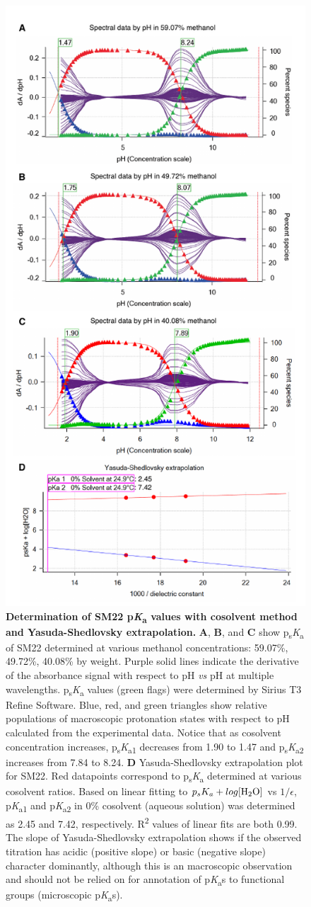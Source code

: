 \documentclass[9pt,lineno]{elife}
\newcommand{\pKa}{p\textit{K}\textsubscript{a}}
\newcommand{\psKa}{p\textsubscript{s}\textit{K}\textsubscript{a}}
\begin{document}
\begin{figure}
\begin{center}
\includegraphics[width=0.5\linewidth]{figures/SM22_cosolvent_extrapolation_fig}
\caption{{\bf Determination of SM22 \pKa{} values with cosolvent method and Yasuda-Shedlovsky extrapolation.} 
\textbf{A}, \textbf{B}, and \textbf{C} show \psKa{} of SM22 determined at various methanol concentrations: 59.07\%, 49.72\%, 40.08\% by weight.  
Purple solid lines indicate the derivative of the absorbance signal with respect to pH \emph{vs} pH at multiple wavelengths. 
\psKa{} values (green flags) were determined by Sirius T3 Refine Software. 
Blue, red, and green triangles show relative populations of macroscopic protonation states with respect to pH calculated from the experimental data. 
Notice that as cosolvent concentration increases, \psKa{}\textsubscript{1} decreases from 1.90 to 1.47 and \psKa{}\textsubscript{2} increases from 7.84 to 8.24. 
\textbf{D} Yasuda-Shedlovsky extrapolation plot for SM22. 
Red datapoints correspond to \psKa{} determined at various cosolvent ratios. 
Based on linear fitting to $p_{s}K_{a} + log [\ce{H2O}]$ vs $1/\epsilon$, \pKa{}\textsubscript{1} and \pKa{}\textsubscript{2} in 0\% cosolvent (aqueous solution) was determined as 2.45 and 7.42, respectively. R\textsuperscript{2} values of linear fits are both 0.99. 
The slope of Yasuda-Shedlovsky extrapolation shows if the observed titration has acidic (positive slope) or basic (negative slope) character dominantly, although this is an macroscopic observation and should not be relied on for 
annotation of \pKa{}s to functional groups (microscopic \pKa{}s).
} 
\label{fig:YS_extrapolation}
\end{center}
\end{figure}
\end{document}
